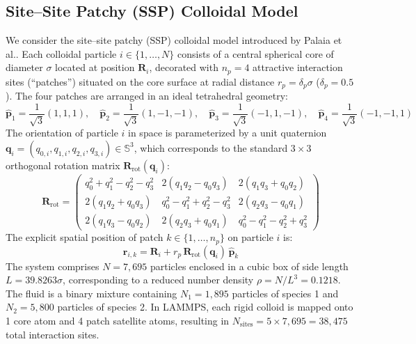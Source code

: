 \documentclass[11pt,a4paper]{article}
\begin{document}
\subsection{Site--Site Patchy (SSP) Colloidal Model}

We consider the site--site patchy (SSP) colloidal model introduced by Palaia et al.\cite{palaia2022patchy}. Each colloidal particle $i \in \{1, \dots, N\}$ consists of a central spherical core of diameter $\sigma$ located at position $\mathbf{R}_i$, decorated with $n_p = 4$ attractive interaction sites (``patches'') situated on the core surface at radial distance $r_p = \delta_p \sigma$ ($\delta_p = 0.5$). The four patches are arranged in an ideal tetrahedral geometry:
\begin{equation}
\hat{\mathbf{p}}_1 = \frac{1}{\sqrt{3}}(1, 1, 1), \quad
\hat{\mathbf{p}}_2 = \frac{1}{\sqrt{3}}(1, -1, -1), \quad
\hat{\mathbf{p}}_3 = \frac{1}{\sqrt{3}}(-1, 1, -1), \quad
\hat{\mathbf{p}}_4 = \frac{1}{\sqrt{3}}(-1, -1, 1)
\end{equation}
The orientation of particle $i$ in space is parameterized by a unit quaternion $\mathbf{q}_i = (q_{0,i}, q_{1,i}, q_{2,i}, q_{3,i}) \in \mathbb{S}^3$, which corresponds to the standard $3 \times 3$ orthogonal rotation matrix $\mathbf{R}_{\mathrm{rot}}(\mathbf{q}_i)$:
\begin{equation}
\mathbf{R}_{\mathrm{rot}} = \begin{pmatrix}
q_0^2 + q_1^2 - q_2^2 - q_3^2 & 2(q_1 q_2 - q_0 q_3) & 2(q_1 q_3 + q_0 q_2) \\
2(q_1 q_2 + q_0 q_3) & q_0^2 - q_1^2 + q_2^2 - q_3^2 & 2(q_2 q_3 - q_0 q_1) \\
2(q_1 q_3 - q_0 q_2) & 2(q_2 q_3 + q_0 q_1) & q_0^2 - q_1^2 - q_2^2 + q_3^2
\end{pmatrix}
\end{equation}
The explicit spatial position of patch $k \in \{1, \dots, n_p\}$ on particle $i$ is:
\begin{equation}
\mathbf{r}_{i, k} = \mathbf{R}_i + r_p \, \mathbf{R}_{\mathrm{rot}}(\mathbf{q}_i) \, \hat{\mathbf{p}}_k
\end{equation}
The system comprises $N = 7{,}695$ particles enclosed in a cubic box of side length $L = 39.8263\sigma$, corresponding to a reduced number density $\rho = N/L^3 = 0.1218$. The fluid is a binary mixture containing $N_1 = 1{,}895$ particles of species 1 and $N_2 = 5{,}800$ particles of species 2. In LAMMPS, each rigid colloid is mapped onto 1 core atom and 4 patch satellite atoms, resulting in $N_{\mathrm{sites}} = 5 \times 7{,}695 = 38{,}475$ total interaction sites.
\end{document}
